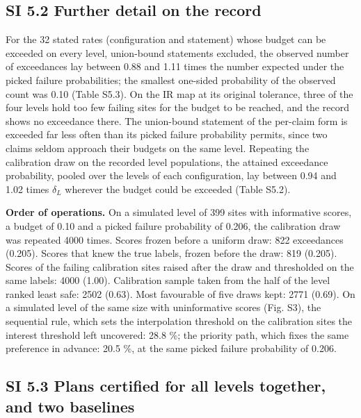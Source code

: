 \documentclass{iopjournal}
\begin{document}
\hypertarget{si-5.2-further-detail-on-the-record}{%
\subsection*{SI 5.2 Further detail on the record}\label{si-5.2-further-detail-on-the-record}}

For the 32 stated rates (configuration and statement) whose budget can be exceeded on every level, union-bound statements excluded, the observed number of exceedances lay between 0.88 and 1.11 times the number expected under the picked failure probabilities; the smallest one-sided probability of the observed count was 0.10 (Table S5.3). On the IR map at its original tolerance, three of the four levels hold too few failing sites for the budget to be reached, and the record shows no exceedance there. The union-bound statement of the per-claim form is exceeded far less often than its picked failure probability permits, since two claims seldom approach their budgets on the same level. Repeating the calibration draw on the recorded level populations, the attained exceedance probability, pooled over the levels of each configuration, lay between 0.94 and 1.02 times \(\delta_L\) wherever the budget could be exceeded (Table S5.2).

\textbf{Order of operations.} On a simulated level of 399 sites with informative scores, a budget of 0.10 and a picked failure probability of 0.206, the calibration draw was repeated 4000 times. Scores frozen before a uniform draw: 822 exceedances (0.205). Scores that knew the true labels, frozen before the draw: 819 (0.205). Scores of the failing calibration sites raised after the draw and thresholded on the same labels: 4000 (1.00). Calibration sample taken from the half of the level ranked least safe: 2502 (0.63). Most favourable of five draws kept: 2771 (0.69). On a simulated level of the same size with uninformative scores (Fig. S3), the sequential rule, which sets the interpolation threshold on the calibration sites the interest threshold left uncovered: 28.8 \%; the priority path, which fixes the same preference in advance: 20.5 \%, at the same picked failure probability of 0.206.

\hypertarget{si-5.3-plans-certified-for-all-levels-together-and-two-baselines}{%
\subsection*{SI 5.3 Plans certified for all levels together, and two baselines}\label{si-5.3-plans-certified-for-all-levels-together-and-two-baselines}}
\end{document}
